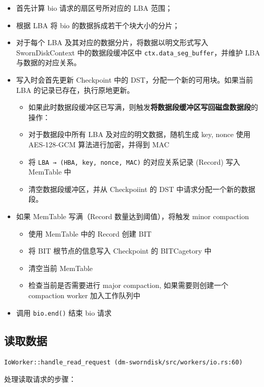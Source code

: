 \begin{itemize}[itemsep=2pt,topsep=0pt,parsep=0pt]
  \item 首先计算 bio 请求的扇区号所对应的 LBA 范围；
  \item 根据 LBA 将 bio 的数据拆成若干个块大小的分片；
  \item 对于每个 LBA 及其对应的数据分片，将数据以明文形式写入 SwornDiskContext 中的数据段缓冲区中 \texttt{ctx.data_seg_buffer}，并维护 LBA 与数据的对应关系。
  \item 写入时会首先更新 Checkpoint 中的 DST，分配一个新的可用块。如果当前 LBA 的记录已存在，执行原地更新。
  \begin{itemize}[itemsep=2pt,topsep=0pt,parsep=0pt]
    \item 如果此时数据段缓冲区已写满，则触发\textbf{将数据段缓冲区写回磁盘数据段}的操作：
    \item 对于数据段中所有 LBA 及对应的明文数据，随机生成 key, nonce 使用 AES-128-GCM 算法进行加密，并得到 MAC
    \item 将 \texttt{LBA → (HBA, key, nonce, MAC)} 的对应关系记录 (Record) 写入 MemTable 中
    \item 清空数据段缓冲区，并从 Checkpoiint 的 DST 中请求分配一个新的数据段。
  \end{itemize}
  \item 如果 MemTable 写满（Record 数量达到阈值），将触发 minor compaction
  \begin{itemize}[itemsep=2pt,topsep=0pt,parsep=0pt]
    \item 使用 MemTable 中的 Record 创建 BIT
    \item 将 BIT 根节点的信息写入 Checkpoint 的 BITCagetory 中
    \item 清空当前 MemTable
    \item 检查当前是否需要进行 major compaction, 如果需要则创建一个 compaction worker 加入工作队列中
  \end{itemize}
  \item 调用 \texttt{bio.end()} 结束 bio 请求
\end{itemize}

\subsection{读取数据}

\texttt{IoWorker::handle_read_request (dm-sworndisk/src/workers/io.rs:60)}

处理读取请求的步骤：

